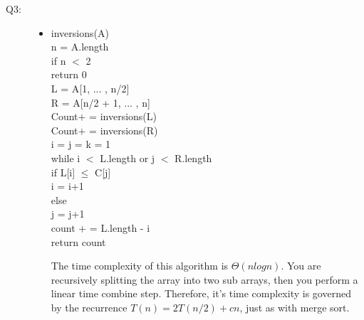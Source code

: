 \documentclass{article}
\begin{document}
\begin{description}
\item[Q3:] 
\begin{itemize}
\item inversions(A)\\
\hspace*{5mm}n = A.length\\
\hspace*{5mm}if n $<$ 2\\
\hspace*{10mm}return 0\\
\hspace*{5mm}L = A[1, ... , n/2]\\
\hspace*{5mm}R = A[n/2 + 1, ... , n]\\
\hspace*{5mm}Count$+$ = inversions(L)\\
\hspace*{5mm}Count$+$ = inversions(R)\\
\hspace*{5mm}i = j = k = 1\\
\hspace*{5mm}while i $<$ L.length or j $<$ R.length\\
\hspace*{10mm}if L[i] $\leq$ C[j]\\
\hspace*{10mm}i = i+1\\
\hspace*{5mm}else\\
\hspace*{10mm}j = j+1\\
\hspace*{10mm}count + = L.length - i\\
\hspace*{5mm}return count\\
\vspace{1mm}

The time complexity of this algorithm is $\Theta (nlogn)$. You are recursively splitting the array into two sub arrays, then you perform a linear time combine step. Therefore, it's time complexity is governed by the recurrence $T(n) = 2T(n/2) + cn$, just as with merge sort.
\end{itemize}
\vspace{5mm}


\end{description}
\end{document}
